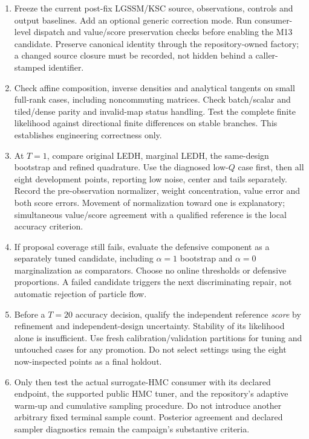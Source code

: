\documentclass[11pt]{article}
\begin{document}
\begin{enumerate}
\item Freeze the current post-fix LGSSM/KSC source, observations, controls
and output baselines. Add an optional generic correction mode. Run
consumer-level dispatch and value/score preservation checks before
enabling the M13 candidate. Preserve canonical identity through the
repository-owned factory; a changed source closure must be recorded,
not hidden behind a caller-stamped identifier.

\item Check affine composition, inverse densities and analytical
tangents on small full-rank cases, including noncommuting matrices.
Check batch/scalar and tiled/dense parity and invalid-map status handling.
Test the complete finite likelihood against directional finite differences
on stable branches. This establishes engineering correctness only.

\item At $T=1$, compare original LEDH, marginal LEDH, the same-design
bootstrap and refined quadrature. Use the diagnosed low-$Q$ case first,
then all eight development points, reporting low noise, center and tails
separately. Record the pre-observation normalizer, weight concentration,
value error and both score errors. Movement of normalization toward one
is explanatory; simultaneous value/score agreement with a qualified
reference is the local accuracy criterion.

\item If proposal coverage still fails, evaluate the defensive component
as a separately tuned candidate, including $\alpha=1$ bootstrap and
$\alpha=0$ marginalization as comparators. Choose no online thresholds
or defensive proportions. A failed candidate triggers the next
discriminating repair, not automatic rejection of particle flow.

\item Before a $T=20$ accuracy decision, qualify the independent reference
\emph{score} by refinement and independent-design uncertainty. Stability
of its likelihood alone is insufficient. Use fresh calibration/validation
partitions for tuning and untouched cases for any promotion. Do not select
settings using the eight now-inspected points as a final holdout.

\item Only then test the actual surrogate-HMC consumer with its declared
endpoint, the supported public HMC tuner, and the repository's adaptive
warm-up and cumulative sampling procedure. Do not introduce another
arbitrary fixed terminal sample count. Posterior agreement and declared
sampler diagnostics remain the campaign's substantive criteria.
\end{enumerate}
\end{document}
